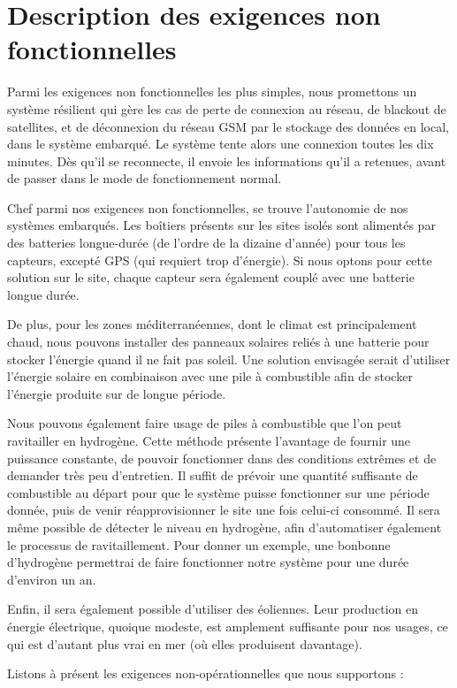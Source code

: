 \section{Description des exigences non fonctionnelles}
Parmi les exigences non fonctionnelles les plus simples, nous promettons un système résilient qui gère les cas de perte de connexion au réseau, de blackout de satellites, et de déconnexion du réseau GSM par le stockage des données en local, dans le système embarqué. Le système tente alors une connexion toutes les dix minutes. Dès qu’il se reconnecte, il envoie les informations qu’il a retenues, avant de passer dans le mode de fonctionnement normal.

Chef parmi nos exigences non fonctionnelles, se trouve l’autonomie de nos systèmes embarqués. Les boîtiers présents sur les sites isolés sont alimentés par des batteries longue-durée (de l’ordre de la dizaine d’année) pour tous les capteurs, excepté GPS (qui requiert trop d’énergie). Si nous optons pour cette solution sur le site, chaque capteur sera également couplé avec une batterie longue durée.

De plus, pour les zones méditerranéennes, dont le climat est principalement chaud, nous pouvons installer des panneaux solaires reliés à une batterie pour stocker l’énergie quand il ne fait pas soleil. Une solution envisagée serait d’utiliser l’énergie solaire en combinaison avec une pile à combustible afin de stocker l’énergie produite sur de longue période.

Nous pouvons également faire usage de piles à combustible que l’on peut ravitailler en hydrogène. Cette méthode présente l’avantage de fournir une puissance constante, de pouvoir fonctionner dans des conditions extrêmes et de demander très peu d’entretien. Il suffit de prévoir une quantité suffisante de combustible au départ pour que le système puisse fonctionner sur une période donnée, puis de venir réapprovisionner le site une fois celui-ci consommé. Il sera même possible de détecter le niveau en hydrogène, afin d’automatiser également le processus de ravitaillement. Pour donner un exemple, une bonbonne d’hydrogène permettrai de faire fonctionner notre système pour une durée d’environ un an. 

Enfin, il sera également possible d’utiliser des éoliennes. Leur production en énergie électrique, quoique modeste, est amplement suffisante pour nos usages, ce qui est d’autant plus vrai en mer (où elles produisent davantage).

Listons à présent les exigences non-opérationnelles que nous supportons :

